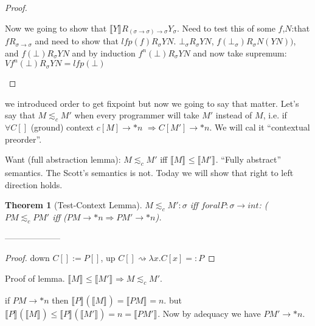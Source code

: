\documentclass[a4paper,10pt]{book}
\newtheorem{theorem}{Theorem}
\newcommand{\sem}[2]{ \llbracket#1\rrbracket_{#2} }
\newcommand{\rarr}{ \rightarrow }
\begin{document}
\begin{proof}
\begin{enumerate}
  Now we going to show that $\sem{Y}{}R_{(\sigma\rarr\sigma)\rarr \sigma}Y_\sigma$. Need to test
  this of some $f$,$N$:that $fR_{\sigma\rarr\sigma}$ and need to show that $lfp(f)R_\sigma YN$.
  $\bot_{\sigma}R_\sigma YN$, $f(\bot_\sigma)R_\sigma N(YN))$, and $f(\bot)R_\sigma YN$ and by 
  induction $f^n(\bot)R_\sigma YN$  and now take supremum: $V f^n(\bot)R_\sigma YN = lfp(\bot)$
  
 \end{enumerate}

\end{proof}

we introduced order to get fixpoint but now we going to say that matter. Let's say that
$M \lesssim_{c} M'$ when every programmer will take $M'$ instead of $M$, i.e.
if $\forall C[]$ (ground) context $c[M] \rarr*n$ $\Rightarrow C[M']\rarr*n$. We will 
cal it ``contextual preorder''.

Want (full abstraction lemma): $M\lesssim_c M'$ iff $\sem{M}{} \leqslant \sem{M'}{}$. ``Fully abstract'' semantics.
The Scott's semantics is not. Today we will show that right to left direction holds.

\begin{theorem}[Test-Context Lemma]
 $M \lesssim_c M': \sigma$ iff $foral P: \sigma \rarr int$: ($PM \lesssim_c PM'$ iff
 ($PM \rarr * n \Rightarrow PM' \rarr* n$).
 
\end{theorem}
--------------------
\begin{proof}
 down $C[] := P[]$, up $C[] \rightsquigarrow \lambda x. C[x]=:P$
\end{proof}

 Proof of lemma.
 $\sem{M}{} \leqslant \sem{M'}{} \Rightarrow M \lesssim_c M'$.
 
 if $PM \rarr * n$ then $\sem{P}{}(\sem{M}{}) = \sem{PM}{}=n$. but 
 $\sem{P}{}(\sem{M}{}) \leqslant \sem{P}{}(\sem{M'}{}) = n = \sem{PM'}{}$. Now by adequacy we have 
 $PM'\rarr* n$.
\end{document}

